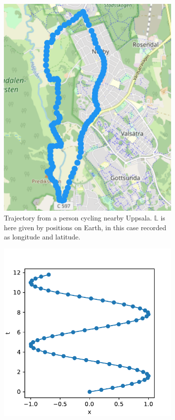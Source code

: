 \documentclass[12pt]{article}
\newcommand{\locset}{\mathbb{L}}
\theoremstyle{definition}
\begin{document}
\begin{figure}
  \centering
  \begin{subfigure}[t]{0.45\textwidth}
    \includegraphics[width=\textwidth]{figures/trajectory-uppsala.png}
    \caption{Trajectory from a person cycling nearby Uppsala.
      \(\locset\) is here given by positions on Earth, in this case
      recorded as longitude and latitude.}
    \label{fig:trajectory-uppsala}
  \end{subfigure}
  \begin{subfigure}[t]{0.45\textwidth}
    \includegraphics[width=\textwidth]{figures/trajectory-abstract.pdf}

\end{subfigure}
\end{figure}
\end{document}

